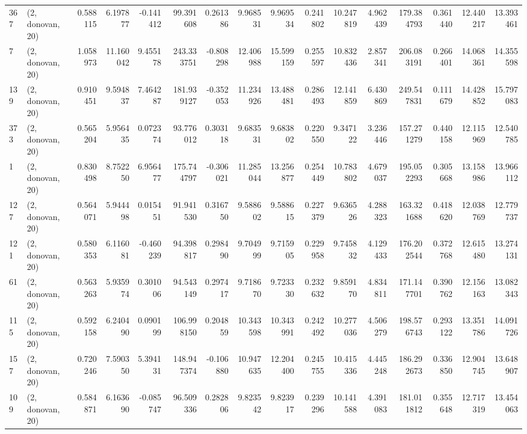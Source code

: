 \begin{tabular}{llrrrrrrrrrrrrrr}
367 &  (2, donovan, 20) &   0.588115 &   6.197877 &  -0.141412 &    99.391608 &   0.261386 &   9.968531 &   9.969534 &  0.241802 &  10.247819 &   4.962439 &    179.384793 &    0.361440 &   12.440217 &   13.393461 \\
7   &  (2, donovan, 20) &   1.058973 &  11.160042 &   9.455178 &   243.333751 &  -0.808298 &  12.406988 &  15.599159 &  0.255597 &  10.832436 &   2.857341 &    206.083191 &    0.266401 &   14.068361 &   14.355598 \\
139 &  (2, donovan, 20) &   0.910451 &   9.594837 &   7.464287 &   181.939127 &  -0.352053 &  11.234926 &  13.488481 &  0.286493 &  12.141859 &   6.430869 &    249.547831 &    0.111679 &   14.428852 &   15.797083 \\
373 &  (2, donovan, 20) &   0.565204 &   5.956435 &   0.072374 &    93.776012 &   0.303118 &   9.683531 &   9.683802 &  0.220550 &   9.347122 &   3.236446 &    157.271279 &    0.440158 &   12.115969 &   12.540785 \\
1   &  (2, donovan, 20) &   0.830498 &   8.752250 &   6.956477 &   175.744797 &  -0.306021 &  11.285044 &  13.256877 &  0.254449 &  10.783802 &   4.679037 &    195.052293 &    0.305668 &   13.158986 &   13.966112 \\
127 &  (2, donovan, 20) &   0.564071 &   5.944498 &   0.015451 &    91.941530 &   0.316750 &   9.588602 &   9.588615 &  0.227379 &   9.636526 &   4.288323 &    163.321688 &    0.418620 &   12.038769 &   12.779737 \\
121 &  (2, donovan, 20) &   0.580353 &   6.116081 &  -0.460239 &    94.398817 &   0.298490 &   9.704999 &   9.715905 &  0.229958 &   9.745832 &   4.129433 &    176.202544 &    0.372768 &   12.615480 &   13.274131 \\
61  &  (2, donovan, 20) &   0.563263 &   5.935974 &   0.301006 &    94.543149 &   0.297417 &   9.718670 &   9.723330 &  0.232632 &   9.859170 &   4.834811 &    171.147701 &    0.390762 &   12.156163 &   13.082343 \\
115 &  (2, donovan, 20) &   0.592158 &   6.240490 &   0.090199 &   106.998150 &   0.204859 &  10.343598 &  10.343991 &  0.242492 &  10.277036 &   4.506279 &    198.576743 &    0.293122 &   13.351786 &   14.091726 \\
157 &  (2, donovan, 20) &   0.720246 &   7.590350 &   5.394131 &   148.947374 &  -0.106880 &  10.947635 &  12.204400 &  0.245755 &  10.415336 &   4.445248 &    186.292673 &    0.336850 &   12.904745 &   13.648907 \\
109 &  (2, donovan, 20) &   0.584871 &   6.163690 &  -0.085747 &    96.509336 &   0.282806 &   9.823542 &   9.823917 &  0.239296 &  10.141588 &   4.391083 &    181.011812 &    0.355648 &   12.717319 &   13.454063 \\

\end{tabular}
